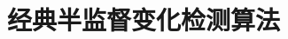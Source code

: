 \documentclass[lang=chs, degree=master, blindreview=false, adobe=false]{yanputhesis}
\begin{document}

\section{经典半监督变化检测算法}
\end{document}
